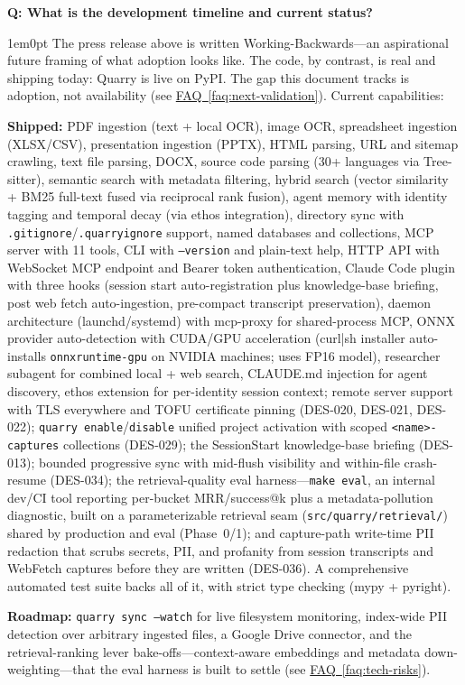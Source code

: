\documentclass[11pt,letterpaper]{article}
\newcounter{faqnum}
\newenvironment{faqpair}[1]{%
  \needspace{4\baselineskip}%
  \vspace{0.5em}%
  \refstepcounter{faqnum}%
  \noindent\textbf{\color{SectionBlue}Q\thefaqnum: #1}\par\nopagebreak[4]%
  \vspace{0.2em}%
  \begin{adjustwidth}{1em}{0pt}%
  \setlength{\parindent}{0pt}%
}{%
  \end{adjustwidth}%
  \vspace{0.5em}%
}
\newcommand{\faqref}[1]{\hyperref[#1]{FAQ~\ref*{#1}}}
\begin{document}
\begin{faqpair}{What is the development timeline and current status?}\label{faq:timeline}
  The press release above is written Working-Backwards---an aspirational future
  framing of what adoption looks like. The code, by contrast, is real and
  shipping today: Quarry is live on PyPI. The gap this document
  tracks is adoption, not availability (see \faqref{faq:next-validation}).
  Current capabilities:

  \textbf{Shipped:} PDF ingestion (text + local OCR), image
  OCR, spreadsheet ingestion (XLSX/CSV), presentation ingestion (PPTX), HTML
  parsing, URL and sitemap crawling, text file parsing, DOCX, source code
  parsing (30+ languages via Tree-sitter), semantic search with metadata
  filtering, hybrid search (vector similarity + BM25 full-text fused via
  reciprocal rank fusion), agent memory with identity tagging and temporal
  decay (via ethos integration), directory sync with
  \texttt{.gitignore}/\texttt{.quarryignore} support, named databases and
  collections, MCP server with 11 tools, CLI with \texttt{--version} and
  plain-text help, HTTP API with WebSocket MCP endpoint and Bearer token
  authentication, Claude Code plugin with three hooks (session start
  auto-registration plus knowledge-base briefing, post web fetch
  auto-ingestion, pre-compact transcript preservation), daemon architecture
  (launchd/systemd) with mcp-proxy for shared-process MCP, ONNX provider
  auto-detection with CUDA/GPU acceleration (curl|sh installer auto-installs
  \texttt{onnxruntime-gpu} on NVIDIA machines; uses FP16 model), researcher
  subagent for combined local + web search, CLAUDE.md injection for agent
  discovery, ethos extension for per-identity session context; remote server
  support with TLS everywhere and TOFU certificate pinning (DES-020, DES-021,
  DES-022); \texttt{quarry enable}/\texttt{disable} unified project activation
  with scoped \texttt{<name>-captures} collections (DES-029); the SessionStart
  knowledge-base briefing (DES-013); bounded progressive sync with mid-flush
  visibility and within-file crash-resume (DES-034); the retrieval-quality eval
  harness---\texttt{make eval}, an internal dev/CI tool reporting per-bucket
  MRR/success@k plus a metadata-pollution diagnostic, built on a
  parameterizable retrieval seam (\texttt{src/quarry/retrieval/}) shared by
  production and eval (Phase~0/1); and capture-path write-time PII redaction
  that scrubs secrets, PII, and profanity from session transcripts and
  WebFetch captures before they are written (DES-036). A comprehensive
  automated test suite backs all of it, with strict type checking
  (mypy + pyright).

  \textbf{Roadmap:} \texttt{quarry sync --watch} for live filesystem monitoring,
  index-wide PII detection over arbitrary ingested files, a Google Drive
  connector, and the retrieval-ranking lever bake-offs---context-aware embeddings
  and metadata down-weighting---that the eval harness is built to settle (see
  \faqref{faq:tech-risks}).
\end{faqpair}
\end{document}
